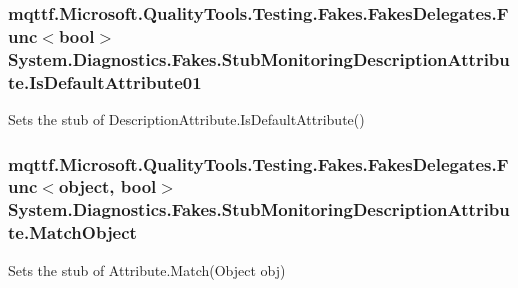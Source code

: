 \hypertarget{class_system_1_1_diagnostics_1_1_fakes_1_1_stub_monitoring_description_attribute_ac2aff0bfbc5a7cc3314ec87034d3722d}{
\subsubsection[{Is\-Default\-Attribute01}]{\setlength{\rightskip}{0pt plus 5cm}mqttf.\-Microsoft.\-Quality\-Tools.\-Testing.\-Fakes.\-Fakes\-Delegates.\-Func$<$bool$>$ System.\-Diagnostics.\-Fakes.\-Stub\-Monitoring\-Description\-Attribute.\-Is\-Default\-Attribute01}}\label{class_system_1_1_diagnostics_1_1_fakes_1_1_stub_monitoring_description_attribute_ac2aff0bfbc5a7cc3314ec87034d3722d}


Sets the stub of Description\-Attribute.\-Is\-Default\-Attribute()

\hypertarget{class_system_1_1_diagnostics_1_1_fakes_1_1_stub_monitoring_description_attribute_aca83fa79e410ce2e21c762c169360b4a}{
\subsubsection[{Match\-Object}]{\setlength{\rightskip}{0pt plus 5cm}mqttf.\-Microsoft.\-Quality\-Tools.\-Testing.\-Fakes.\-Fakes\-Delegates.\-Func$<$object, bool$>$ System.\-Diagnostics.\-Fakes.\-Stub\-Monitoring\-Description\-Attribute.\-Match\-Object}}\label{class_system_1_1_diagnostics_1_1_fakes_1_1_stub_monitoring_description_attribute_aca83fa79e410ce2e21c762c169360b4a}


Sets the stub of Attribute.\-Match(\-Object obj)

